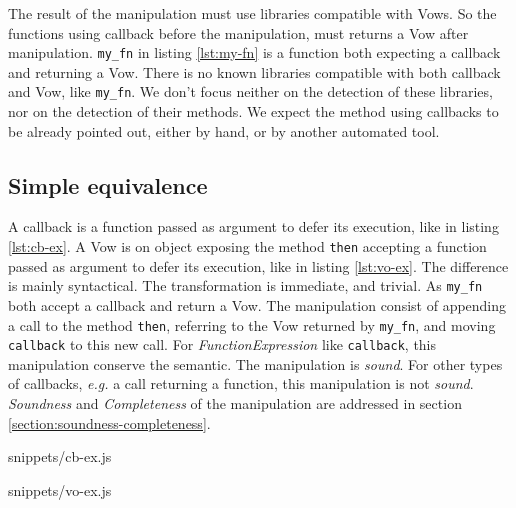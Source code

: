 The result of the manipulation must use libraries compatible with Vows.
So the functions using callback before the manipulation, must returns a Vow after manipulation.
\texttt{my_fn} in listing \ref{lst:my-fn} is a function both expecting a callback and returning a Vow.
There is no known libraries compatible with both callback and Vow, like \texttt{my_fn}.
We don't focus neither on the detection of these libraries, nor on the detection of their methods.
We expect the method using callbacks to be already pointed out, either by hand, or by another automated tool.


\subsection{Simple equivalence} \label{section:equivalences:general}

A callback is a function passed as argument to defer its execution, like in listing \ref{lst:cb-ex}.
A Vow is on object exposing the method \texttt{then} accepting a function passed as argument to defer its execution, like in listing \ref{lst:vo-ex}.
The difference is mainly syntactical.
The transformation is immediate, and trivial.
As \texttt{my_fn} both accept a callback and return a Vow.
The manipulation consist of appending a call to the method \texttt{then}, referring to the Vow returned by \texttt{my_fn}, and moving \texttt{callback} to this new call.
For \textit{FunctionExpression} like \texttt{callback}, this manipulation conserve the semantic.
The manipulation is \textit{sound}.
For other types of callbacks, \textit{e.g.} a call returning a function, this manipulation is not \textit{sound}.
\textit{Soundness} and \textit{Completeness} of the manipulation are addressed in section \ref{section:soundness-completeness}.

             {snippets/cb-ex.js}

             {snippets/vo-ex.js}

